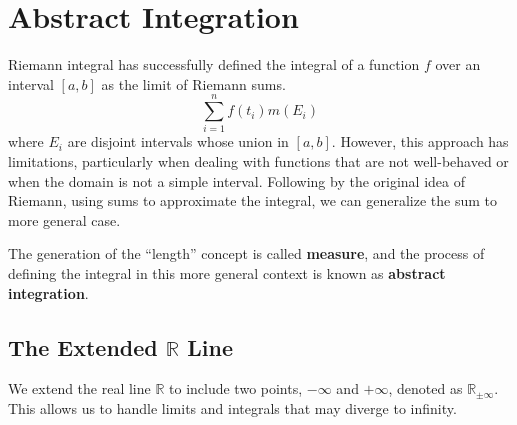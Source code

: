 \documentclass[../main.tex]{subfiles}
\begin{document}
\chapter{Abstract Integration}

Riemann integral has successfully defined the integral of a function $f$ over an interval $[a,b]$ as the limit of Riemann sums. 
\begin{equation*}
\sum_{i=1}^{n} f(t_i) m(E_i)
\end{equation*}
where $E_i$ are disjoint intervals whose union in $[a,b]$. However, this approach has limitations, particularly when dealing with functions that are not well-behaved or when the domain is not a simple interval. Following by the original idea of Riemann, using sums to approximate the integral, we can generalize the sum to more general case.

The generation of the ``length'' concept is called \textbf{measure}, and the process of defining the integral in this more general context is known as \textbf{abstract integration}.

\section{The Extended $\mathbb{R}$ Line}
We extend the real line $\mathbb{R}$ to include two points, $-\infty$ and $+\infty$, denoted as $\mathbb{R}_{\pm \infty}$. This allows us to handle limits and integrals that may diverge to infinity.
\end{document}
